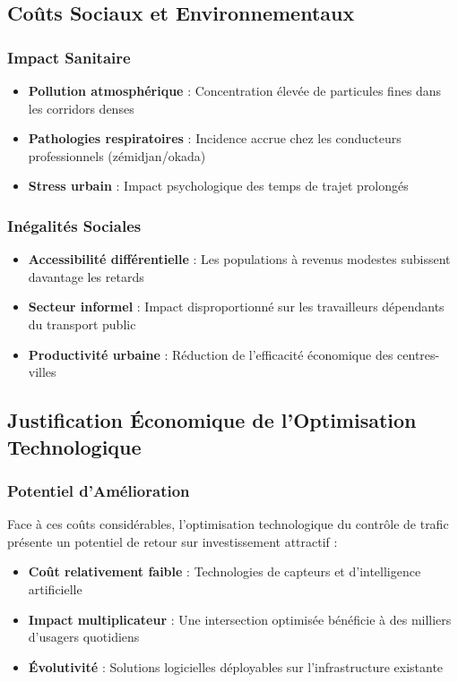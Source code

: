 \subsection{Coûts Sociaux et Environnementaux}

\subsubsection{Impact Sanitaire}
\begin{itemize}
    \item \textbf{Pollution atmosphérique} : Concentration élevée de particules fines dans les corridors denses
    \item \textbf{Pathologies respiratoires} : Incidence accrue chez les conducteurs professionnels (zémidjan/okada)
    \item \textbf{Stress urbain} : Impact psychologique des temps de trajet prolongés
\end{itemize}

\subsubsection{Inégalités Sociales}
\begin{itemize}
    \item \textbf{Accessibilité différentielle} : Les populations à revenus modestes subissent davantage les retards
    \item \textbf{Secteur informel} : Impact disproportionné sur les travailleurs dépendants du transport public
    \item \textbf{Productivité urbaine} : Réduction de l'efficacité économique des centres-villes
\end{itemize}

\subsection{Justification Économique de l'Optimisation Technologique}

\subsubsection{Potentiel d'Amélioration}
Face à ces coûts considérables, l'optimisation technologique du contrôle de trafic présente un potentiel de retour sur investissement attractif :
\begin{itemize}
    \item \textbf{Coût relativement faible} : Technologies de capteurs et d'intelligence artificielle
    \item \textbf{Impact multiplicateur} : Une intersection optimisée bénéficie à des milliers d'usagers quotidiens
    \item \textbf{Évolutivité} : Solutions logicielles déployables sur l'infrastructure existante
\end{itemize}


